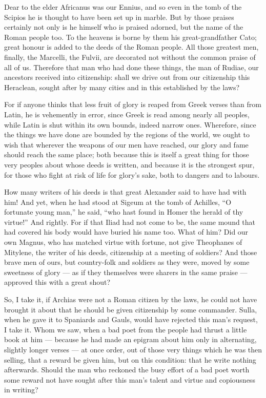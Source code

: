  Dear to the elder Africanus was our Ennius, and so even in the tomb of the Scipios he is thought to have been set up in marble. But by those praises certainly not only is he himself who is praised adorned, but the name of the Roman people too. To the heavens is borne by them his great-grandfather Cato; great honour is added to the deeds of the Roman people. All those greatest men, finally, the Marcelli, the Fulvii, are decorated not without the common praise of all of us. Therefore that man who had done these things, the man of Rudiae, our ancestors received into citizenship: shall we drive out from our citizenship this Heraclean, sought after by many cities and in this established by the laws?

 For if anyone thinks that less fruit of glory is reaped from Greek verses than from Latin, he is vehemently in error, since Greek is read among nearly all peoples, while Latin is shut within its own bounds, indeed narrow ones. Wherefore, since the things we have done are bounded by the regions of the world, we ought to wish that wherever the weapons of our men have reached, our glory and fame should reach the same place; both because this is itself a great thing for those very peoples about whose deeds is written, and because it is the strongest spur, for those who fight at risk of life for glory's sake, both to dangers and to labours.

 How many writers of his deeds is that great Alexander said to have had with him! And yet, when he had stood at Sigeum at the tomb of Achilles, ``O fortunate young man,'' he said, ``who hast found in Homer the herald of thy virtue!'' And rightly. For if that Iliad had not come to be, the same mound that had covered his body would have buried his name too. What of him? Did our own Magnus, who has matched virtue with fortune, not give Theophanes of Mitylene, the writer of his deeds, citizenship at a meeting of soldiers? And those brave men of ours, but country-folk and soldiers as they were, moved by some sweetness of glory --- as if they themselves were sharers in the same praise --- approved this with a great shout?

 So, I take it, if Archias were not a Roman citizen by the laws, he could not have brought it about that he should be given citizenship by some commander. Sulla, when he gave it to Spaniards and Gauls, would have rejected this man's request, I take it. Whom we saw, when a bad poet from the people had thrust a little book at him --- because he had made an epigram about him only in alternating, slightly longer verses --- at once order, out of those very things which he was then selling, that a reward be given him, but on this condition: that he write nothing afterwards. Should the man who reckoned the busy effort of a bad poet worth some reward not have sought after this man's talent and virtue and copiousness in writing?

